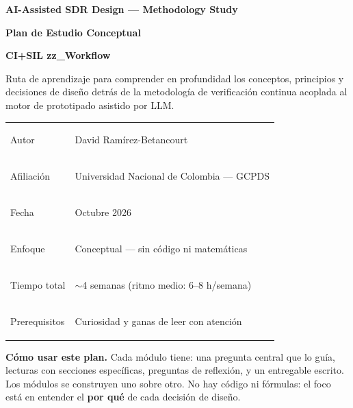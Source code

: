 \documentclass[11pt,a4paper]{article}
\begin{document}
\begin{titlepage}
\thispagestyle{empty}
\noindent\colorbox{accent}{\makebox[\dimexpr\textwidth-2\fboxsep][l]{\rule{0pt}{4pt}}}
\vspace*{30mm}

{\sffamily\bfseries\color{muted} AI-Assisted SDR Design --- Methodology Study\par}
\vspace{4mm}
{\raggedright{}\sffamily\bfseries\fontsize{26}{31}\selectfont\color{ink} Plan de Estudio Conceptual\par}
\vspace{2mm}
{\raggedright\sffamily\bfseries\fontsize{18}{22}\selectfont\color{accent} CI+SIL \texttimes{} zz\_Workflow\par}
\vspace{5mm}
{\large\color{muted} Ruta de aprendizaje para comprender en profundidad los conceptos, principios y decisiones de dise\~no detr\'as de la metodolog\'ia de verificaci\'on continua acoplada al motor de prototipado asistido por LLM.\par}
\vspace{14mm}
{\small\begin{tabular}{@{}>{\bfseries\sffamily\raggedright\arraybackslash}p{}>{\raggedright\arraybackslash}p{}@{}}
Autor & David Ram\'irez-Betancourt \\[3pt]
Afiliaci\'on & Universidad Nacional de Colombia --- GCPDS \\[3pt]
Fecha & Octubre 2026 \\[3pt]
Enfoque & Conceptual --- sin c\'odigo ni matem\'aticas \\[3pt]
Tiempo total & $\sim$4 semanas (ritmo medio: 6--8 h/semana) \\[3pt]
Prerequisitos & Curiosidad y ganas de leer con atenci\'on \\
\end{tabular}}

\vfill
\begin{notebox}
\textbf{C\'omo usar este plan.} Cada m\'odulo tiene: una pregunta central que lo gu\'ia, lecturas con secciones espec\'ificas, preguntas de reflexi\'on, y un entregable escrito. Los m\'odulos se construyen uno sobre otro. No hay c\'odigo ni f\'ormulas: el foco est\'a en entender el \textbf{por qu\'e} de cada decisi\'on de dise\~no.
\end{notebox}
\end{titlepage}
\end{document}
